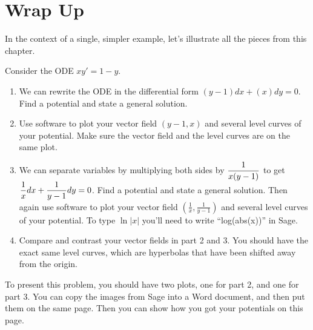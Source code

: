\section*{Wrap Up}

In the context of a single, simpler example, let's illustrate all the pieces from this chapter.
\begin{problem}
 Consider the ODE $xy'=1-y$.   
\begin{enumerate}
 \item We can rewrite the ODE in the differential form $(y-1)dx+(x)dy=0$.  Find a potential and state a general solution.
 \item 
{}%
Use software to plot your vector field $(y-1,x)$ and several level curves of your potential. Make sure the vector field and the level curves are on the same plot.
 \item 
We can separate variables by multiplying both sides by $\displaystyle\frac{1}{x(y-1)}$ to get $\displaystyle\frac{1}{x}dx+\frac{1}{y-1}dy=0$. Find a potential and state a general solution. Then again use software to plot your vector field $(\frac{1}{x},\frac{1}{y-1})$ and several level curves of your potential. To type $\ln|x|$ you'll need to write ``log(abs(x))'' in Sage. 
 \item 
Compare and contrast your vector fields in part 2 and 3. You should have the exact same level curves, which are hyperbolas that have been shifted away from the origin. 
\end{enumerate}
To present this problem, you should have two plots, one for part 2, and one for part 3. You can copy the images from Sage into a Word document, and then put them on the same page. Then you can show how you got your potentials on this page. 
\end{problem}


